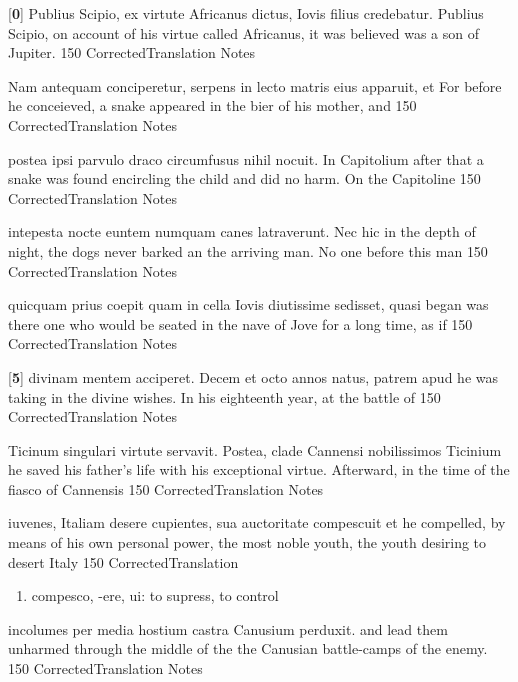 \latline
  {[\textbf{0}] Publius Scipio, ex virtute Africanus dictus, Iovis filius credebatur.}
  { Publius Scipio, on account of his virtue called Africanus, it was believed was a son of Jupiter. }
  {150}
  { CorrectedTranslation }
  { Notes }


\latline
  {Nam antequam conciperetur, serpens in lecto matris eius apparuit, et}
  { For before he conceieved, a snake appeared in the bier of his mother, and }
  {150}
  { CorrectedTranslation }
  { Notes }


\latline
  {postea ipsi parvulo draco circumfusus nihil nocuit.  In Capitolium }
  { after that a snake was found encircling the child and did no harm.  On the Capitoline }
  {150}
  { CorrectedTranslation }
  { Notes }


\latline
  {intepesta nocte euntem numquam canes latraverunt.  Nec hic}
  { in the depth of night, the dogs never barked an the arriving man.  No one before this man }
  {150}
  { CorrectedTranslation }
  { Notes }


\latline
  {quicquam prius coepit quam in cella Iovis diutissime sedisset, quasi}
  { began was there one who would be seated in the nave of Jove for a long time, as if }
  {150}
  { CorrectedTranslation }
  { Notes }


\latline
  {[\textbf{5}] divinam mentem acciperet.  Decem et octo annos natus, patrem apud}
  { he was taking in the divine wishes.  In his eighteenth year, at the battle of  }
  {150}
  { CorrectedTranslation }
  { Notes }


\latline
  {Ticinum singulari virtute servavit.  Postea, clade Cannensi nobilissimos}
  { Ticinium he saved his father's life with his exceptional virtue.  Afterward, in the time of the fiasco of Cannensis }
  {150}
  { CorrectedTranslation }
  { Notes }


\latline
  {iuvenes, Italiam desere cupientes, sua auctoritate compescuit et}
  { he compelled, by means of his own personal power, the most noble youth, the youth desiring to desert Italy }
  {150}
  { CorrectedTranslation }
  { \begin{enumerate}
  	\item compesco, -ere, ui:  to supress, to control
  \end{enumerate} }


\latline
  {incolumes per media hostium castra Canusium perduxit.}
  { and lead them unharmed through the middle of the the Canusian battle-camps of the enemy. }
  {150}
  { CorrectedTranslation }
  { Notes }


